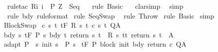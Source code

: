 \begin{isabellebody}
\ \ {\isacharparenleft}rule{\isacharunderscore}tac\ R{\isacharequal}{\isachardoublequoteopen}{\isacharbraceleft}i{\isachardot}\ i\ {\isasymin}\ P{\isacharprime}\ Z{\isacharbraceright}{\isachardoublequoteclose}\ \ Seq{\isacharparenright}\isanewline
{}\isamarkupfalse%
\ \ \ {\isacharparenleft}rule\ Basic{\isacharparenright}\isanewline
{}\isamarkupfalse%
\ \ \ clarsimp\isanewline
{}\isamarkupfalse%
\ \ simp\isanewline
{}\isamarkupfalse%
\ \ {\isacharparenleft}rule\ bdy\ {\isacharbrackleft}rule{\isacharunderscore}format{\isacharbrackright}{\isacharparenright}\isanewline
{}\isamarkupfalse%
\ {\isacharparenleft}rule\ SeqSwap{\isacharparenright}\isanewline
{}\isamarkupfalse%
\ \ {\isacharparenleft}rule\ Throw{\isacharparenright}\isanewline
{}\isamarkupfalse%
\ {\isacharparenleft}rule\ Basic{\isacharparenright}\isanewline
{}\isamarkupfalse%
\ simp\isanewline
{}\isamarkupfalse%
%
\endisatagproof
{\isafoldproof}%
%
\isadelimproof
\isanewline
%
\endisadelimproof
\isanewline
{}\isamarkupfalse%
\ BlockSwap{\isacharcolon}\isanewline
{}\ c{\isacharcolon}\ {\isachardoublequoteopen}{\isasymforall}s\ t{\isachardot}\ {\isasymGamma}{\isacharcomma}{\isasymTheta}{\isasymturnstile}\isactrlsub t\isactrlbsub {\isacharslash}F\isactrlesub \ {\isacharparenleft}R\ s\ t{\isacharparenright}\ {\isacharparenleft}c\ s\ t{\isacharparenright}\ Q{\isacharcomma}A{\isachardoublequoteclose}\isanewline
{}\ bdy{\isacharcolon}\ {\isachardoublequoteopen}{\isasymforall}s{\isachardot}\ {\isasymGamma}{\isacharcomma}{\isasymTheta}{\isasymturnstile}\isactrlsub t\isactrlbsub {\isacharslash}F\isactrlesub \ {\isacharparenleft}P{\isacharprime}\ s{\isacharparenright}\ bdy\ {\isacharbraceleft}t{\isachardot}\ return\ s\ t\ {\isasymin}\ R\ s\ t{\isacharbraceright}{\isacharcomma}{\isacharbraceleft}t{\isachardot}\ return\ s\ t\ {\isasymin}\ A{\isacharbraceright}{\isachardoublequoteclose}\isanewline
{}\ adapt{\isacharcolon}\ {\isachardoublequoteopen}P\ {\isasymsubseteq}\ {\isacharbraceleft}s{\isachardot}\ init\ s\ {\isasymin}\ P{\isacharprime}\ s{\isacharbraceright}{\isachardoublequoteclose}\isanewline
{}\ {\isachardoublequoteopen}{\isasymGamma}{\isacharcomma}{\isasymTheta}{\isasymturnstile}\isactrlsub t\isactrlbsub {\isacharslash}F\isactrlesub \ P\ {\isacharparenleft}block\ init\ bdy\ return\ c{\isacharparenright}\ Q{\isacharcomma}A{\isachardoublequoteclose}\isanewline
%
\isadelimproof

\end{isabellebody}
